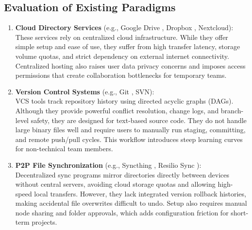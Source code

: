 \subsection{Evaluation of Existing Paradigms}
\begin{enumerate}
    \item \textbf{Cloud Directory Services} (e.g., Google Drive \cite{googledrive}, Dropbox \cite{dropbox}, Nextcloud): \\
    These services rely on centralized cloud infrastructure. While they offer simple setup and ease of use, they suffer from high transfer latency, storage volume quotas, and strict dependency on external internet connectivity. Centralized hosting also raises user data privacy concerns and imposes access permissions that create collaboration bottlenecks for temporary teams.
    
    \item \textbf{Version Control Systems} (e.g., Git \cite{gitbook, github}, SVN): \\
    VCS tools track repository history using directed acyclic graphs (DAGs). Although they provide powerful conflict resolution, change logs, and branch-level safety, they are designed for text-based source code. They do not handle large binary files well and require users to manually run staging, committing, and remote push/pull cycles. This workflow introduces steep learning curves for non-technical team members.
    
    \item \textbf{P2P File Synchronization} (e.g., Syncthing \cite{syncthing}, Resilio Sync \cite{resilio}): \\
    Decentralized sync programs mirror directories directly between devices without central servers, avoiding cloud storage quotas and allowing high-speed local transfers. However, they lack integrated version rollback histories, making accidental file overwrites difficult to undo. Setup also requires manual node sharing and folder approvals, which adds configuration friction for short-term projects.
\end{enumerate}

